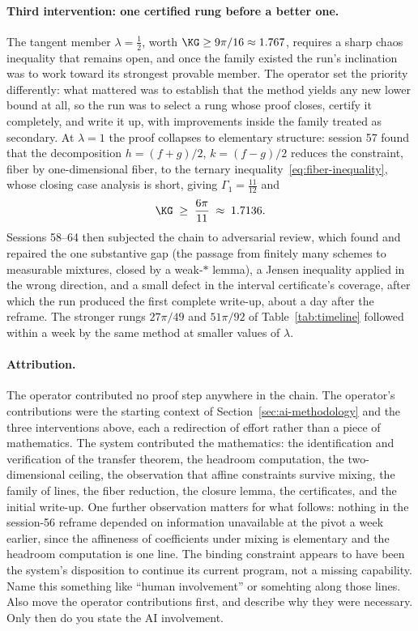 \paragraph{Third intervention: one certified {\color{red}rung} before a better one.}
The tangent member $\lambda=\tfrac12$, worth $\KG\ge9\pi/16\approx1.767$,
requires a sharp chaos inequality that remains open, and once the family
existed the run's inclination was to work toward its strongest provable
member. The operator set the priority differently: what mattered was to
establish that the method yields any new lower bound at all, so the run was
to select a rung whose proof closes, certify it completely, and write it up,
with improvements inside the family treated as secondary. At $\lambda=1$ the
proof collapses to elementary structure: session 57 found that the
decomposition $h=(f+g)/2$, $k=(f-g)/2$ reduces the constraint, fiber by
one-dimensional fiber, to the ternary inequality~\eqref{eq:fiber-inequality},
whose closing case analysis is short, giving $\Gamma_1=\tfrac{11}{12}$ and
\[
        \KG\;\ge\;\frac{6\pi}{11}\;\approx\;1.7136 .
\]
Sessions 58--64 then subjected the chain to adversarial review, which
found and repaired the one substantive gap (the passage from finitely many
schemes to measurable mixtures, closed by a weak-$*$ lemma), a Jensen
inequality applied in the wrong direction, and a small defect in the
interval certificate's coverage, after which the run produced the first
complete write-up, about a day after the reframe. The stronger rungs
$27\pi/49$ and $51\pi/92$ of Table~\ref{tab:timeline} followed within a week
by the same method at smaller values of $\lambda$.



\paragraph{Attribution.}
The operator contributed no proof step anywhere in the chain. The operator's
contributions were the starting context of
Section~\ref{sec:ai-methodology} and the three interventions above, each a
redirection of effort rather than a piece of mathematics. The system
contributed the mathematics: the identification and verification of the
transfer theorem, the headroom computation, the two-dimensional ceiling, the
observation that affine constraints survive mixing, the family of lines, the
fiber reduction, the closure lemma, the certificates, and the initial
write-up. One further observation matters for what follows: nothing in the
session-56 reframe depended on information unavailable at the pivot a week
earlier, since the affineness of coefficients under mixing is elementary and
the headroom computation is one line. The binding constraint appears to have
been the system's disposition to continue its current program, not a missing
capability.
{\color{red} Name this something like ``human involvement'' or somehting along those lines. Also move the operator contributions first, and describe why they were necessary. Only then do you state the AI involvement.}


